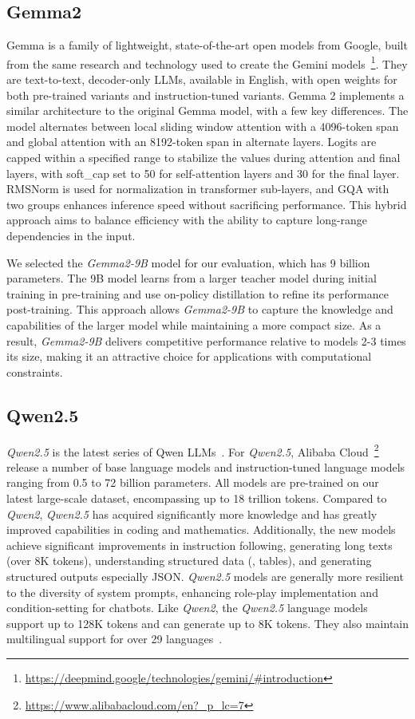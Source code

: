 \subsection{Gemma2}\label{subsec:empirical-evaluation:candidate-models:gemma2}
Gemma is a family of lightweight, state-of-the-art open models from Google, built from the same research and technology used to create the Gemini models~\footnote{\url{https://deepmind.google/technologies/gemini/#introduction}}.
They are text-to-text, decoder-only \acp{LLM}, available in English, with open weights for both pre-trained variants and instruction-tuned variants.
Gemma 2 implements a similar architecture to the original Gemma model, with a few key differences.
The model alternates between local sliding window attention with a 4096-token span and global attention with an 8192-token span in alternate layers.
Logits are capped within a specified range to stabilize the values during attention and final layers, with soft\_cap set to 50 for self-attention layers and 30 for the final layer.
RMSNorm is used for normalization in transformer sub-layers, and \ac{GQA} with two groups enhances inference speed without sacrificing performance.
This hybrid approach aims to balance efficiency with the ability to capture long-range dependencies in the input.

We selected the \textit{Gemma2-9B} model for our evaluation, which has 9 billion parameters.
The 9B model learns from a larger teacher model during initial training in pre-training and use on-policy distillation to refine its performance post-training.
This approach allows \textit{Gemma2-9B} to capture the knowledge and capabilities of the larger model while maintaining a more compact size.
As a result, \textit{Gemma2-9B} delivers competitive performance relative to models 2-3 times its size, making it an attractive choice for applications with computational constraints.

\subsection{Qwen2.5}\label{subsec:empirical-evaluation:candidate-models:qwen2.5}
\textit{Qwen2.5} is the latest series of Qwen LLMs~\cite{qwen2}.
For \textit{Qwen2.5}, Alibaba Cloud~\footnote{\url{https://www.alibabacloud.com/en?_p_lc=7}} release a number of base language models and instruction-tuned language models ranging from 0.5 to 72 billion parameters.
All models are pre-trained on our latest large-scale dataset, encompassing up to 18 trillion tokens.
Compared to \textit{Qwen2}, \textit{Qwen2.5} has acquired significantly more knowledge and has greatly improved capabilities in coding and mathematics.
Additionally, the new models achieve significant improvements in instruction following, generating long texts (over 8K tokens), understanding structured data (\eg, tables), and generating structured outputs especially JSON.
\textit{Qwen2.5} models are generally more resilient to the diversity of system prompts, enhancing role-play implementation and condition-setting for chatbots.
Like \textit{Qwen2}, the \textit{Qwen2.5} language models support up to 128K tokens and can generate up to 8K tokens.
They also maintain multilingual support for over 29 languages~\cite{qwen2.5}.

